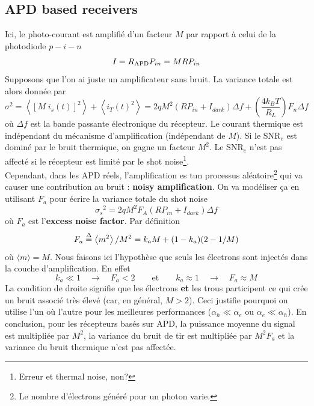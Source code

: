\subsection{APD based receivers}
Ici, le photo-courant est amplifié d'un facteur $M$ par rapport à celui de la photodiode 
$p-i-n$
\begin{equation}
I = {R_{{\rm{APD}}}}{P_{in}} = MR{P_{in}}
\end{equation}
Supposons que l'on ai juste un amplificateur sans bruit. La variance totale est alors donnée par
\begin{equation}
{\sigma ^2} = \left\langle {{{[M\;{i_s}(t)]}^2}} \right\rangle  + \left\langle {{i_T}{{(t)}^2}} \right\rangle  = 2q{M^2}\left( {R{P_{in}} + {I_{dark}}} \right)\Delta f + \left( {\frac{{4{k_B}T}}{{{R_L}}}} \right){F_n}\Delta f
\end{equation}
où $\Delta f$ est la bande passante électronique du récepteur. Le courant thermique est 
indépendant du mécanisme d'amplification (indépendant de $M$). Si le SNR$_e$ est dominé par 
le bruit thermique, on gagne un facteur $M^2$. Le SNR$_e$ n'est pas affecté si le récepteur
est limité par le shot noise\footnote{Erreur et thermal noise, non?}. \\

Cependant, dans les APD réels, l'amplification es tun processus aléatoire\footnote{Le nombre
d'électrons généré pour un photon varie.} qui va causer une contribution au bruit : \textbf{noisy
amplification}. On va modéliser ça en utilisant $F_a$ pour écrire la variance totale du shot noise
\begin{equation}
{\sigma _s}^2 = 2q{M^2}{F_A}\left( {R{P_{in}} + {I_{dark}}} \right)\Delta f
\end{equation}
où $F_a$ est l'\textbf{excess noise factor}. Par définition
\begin{equation}
{F_a} \buildrel \Delta \over = \left\langle {{m^2}} \right\rangle /{M^2} = {k_a}M + (1 - {k_a})(2 - 1/M)
\end{equation}
où $\langle m \rangle = M$. Nous faisons ici l'hypothèse que seuls les électrons sont injectés dans
la couche d'amplification. En effet
\begin{equation}
k_a \ll 1 \quad\to \quad F_a<2\qquad\text{et}\qquad k_a\approx1\quad\to\quad F_a\approx M
\end{equation}
La condition de droite signifie que les électrons \textbf{et} les trous participent ce qui crée
un bruit associé très élevé (car, en général, $M>2$). Ceci justifie pourquoi on utilise l'un où
l'autre pour les meilleures performances ($\alpha_h \ll \alpha_e$ ou $\alpha_e \ll \alpha_h$). En
conclusion, pour les récepteurs basés sur APD, la puissance moyenne du signal est multipliée par
$M^2$, la variance du bruit de tir est multipliée par $M^2F_a$ et la variance du bruit thermique 
n'est pas affectée.\\

